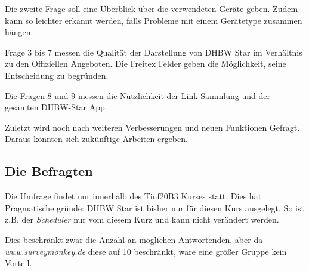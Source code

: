 Die zweite Frage soll eine Überblick über die verwendeten Geräte geben. Zudem kann so leichter erkannt werden, falls Probleme mit einem Gerätetype zusammen hängen.

Frage 3 bis 7 messen die Qualität der Darstellung von DHBW Star im Verhältnis zu den Offiziellen Angeboten. Die Freitex Felder geben die Möglichkeit, seine Entscheidung zu begründen.

Die Fragen 8 und 9 messen die Nützlichkeit der Link-Sammlung und der gesamten DHBW-Star App.

Zuletzt wird noch nach weiteren Verbesserungen und neuen Funktionen Gefragt. Daraus könnten sich zukünftige Arbeiten ergeben.

\subsection{Die Befragten}
Die Umfrage findet nur innerhalb des Tinf20B3 Kurses statt. Dies hat Pragmatische gründe: DHBW Star ist bisher nur für diesen Kurs ausgelegt. So ist z.B. der \emph{Scheduler} nur vom diesem Kurz und kann nicht verändert werden.

Dies beschränkt zwar die Anzahl an möglichen Antwortenden, aber da \emph{www.surveymonkey.de} diese auf 10 beschränkt, wäre eine größer Gruppe kein Vorteil.




 

